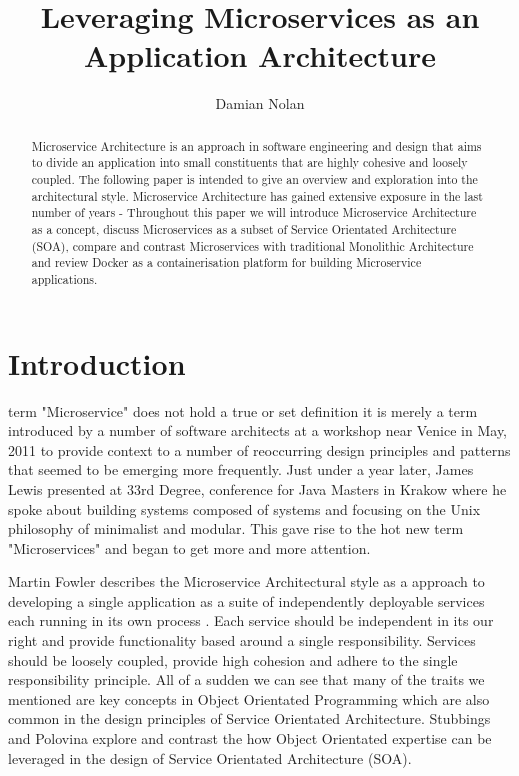 \documentclass[journal]{IEEEtran}
\begin{document}
\title{Leveraging Microservices as an \\ Application Architecture}


\author{ Damian Nolan }

\maketitle

\begin{abstract}
Microservice Architecture is an approach in software engineering and design that aims to divide an application into small constituents that are highly cohesive and loosely coupled. The following paper is intended to give an overview and exploration into the architectural style. Microservice Architecture has gained extensive exposure in the last number of years - Throughout this paper we will introduce Microservice Architecture as a concept, discuss Microservices as a subset of Service Orientated Architecture (SOA), compare and contrast Microservices with traditional Monolithic Architecture and review Docker as a containerisation platform for building Microservice applications.
\end{abstract}

\section{Introduction}

 term "Microservice" does not hold a true or set definition it is merely a term introduced by a number of software architects at a workshop near Venice in May, 2011 to provide context to a number of reoccurring design principles and patterns that seemed to be emerging more frequently.
	Just under a year later, James Lewis presented at 33rd Degree, conference for Java Masters in Krakow where he spoke about building systems composed of systems and focusing on the Unix philosophy of minimalist and modular. \cite{JamesLewis33rdDegree} 
This gave rise to the hot new term "Microservices" and began to get more and more attention. 

Martin Fowler describes the Microservice Architectural style as a approach to developing a single application as a suite of independently deployable services each running in its own process \cite{MicroservicesResourceGuide}. Each service should be independent in its our right and provide functionality based around a single responsibility. Services should be loosely coupled, provide high cohesion and adhere to the single responsibility principle. All of a sudden we can see that many of the traits we mentioned are key concepts in Object Orientated Programming which are also common in the design principles of Service Orientated Architecture. Stubbings and Polovina \cite{StubbingsPolovina} explore and contrast the how Object Orientated expertise can be leveraged in the design of Service Orientated Architecture (SOA).
\end{document}
